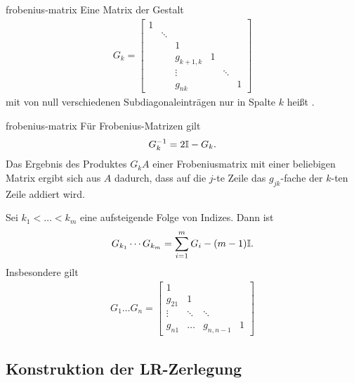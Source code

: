 \begin{Definition}{frobenius-matrix}
  Eine Matrix der Gestalt
  \begin{gather}
    G_k=\begin{bmatrix}
      1 & & & & & \\
      &\ddots & & & & \\
      &   & 1& & &\\
      &   & g_{k+1,k}&1 & &\\
      &   & \vdots& &\ddots &\\
      &   & g_{nk}& & &1
    \end{bmatrix}
  \end{gather}
  mit von null verschiedenen Subdiagonaleinträgen nur in Spalte $k$
  heißt .
\end{Definition}

\begin{Lemma}{frobenius-matrix}
  Für Frobenius-Matrizen gilt
  \begin{gather}
    G_k^{-1} = 2\mathbb I-G_k.
  \end{gather}
  Das Ergebnis des Produktes $G_kA$ einer Frobeniusmatrix mit einer
  beliebigen Matrix ergibt sich aus $A$ dadurch, dass auf die $j$-te
  Zeile das $g_{jk}$-fache der $k$-ten Zeile addiert wird.

  Sei $k_1<\dots<k_m$ eine aufsteigende Folge von Indizes. Dann ist
  \begin{gather}
    G_{k_1}\cdots G_{k_m} = \sum_{i=1}^m G_i - (m-1) \mathbb I.
  \end{gather}
  Insbesondere gilt
  \begin{gather}
    G_1\dots G_n =
    \begin{bmatrix}
      1\\
      g_{21} & 1 \\
      \vdots & \ddots & \ddots \\
      g_{n1}  & \dots & g_{n,n-1} & 1
    \end{bmatrix}
  \end{gather}
\end{Lemma}

\subsection{Konstruktion der LR-Zerlegung}

